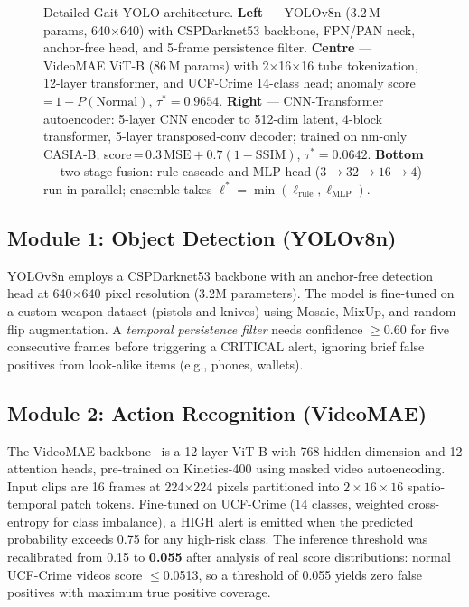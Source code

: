 \documentclass[conference]{IEEEtran}
\begin{document}
\begin{figure}[!t]
{}
\caption{Detailed Gait-YOLO architecture.
\textbf{Left} — YOLOv8n (3.2\,M params, 640$\times$640) with CSPDarknet53
backbone, FPN/PAN neck, anchor-free head, and 5-frame persistence filter.
\textbf{Centre} — VideoMAE ViT-B (86\,M params) with 2$\times$16$\times$16
tube tokenization, 12-layer transformer, and UCF-Crime 14-class head;
anomaly score\,=\,$1-P(\text{Normal})$, $\tau^*=0.9654$.
\textbf{Right} — CNN-Transformer autoencoder: 5-layer CNN encoder to
512-dim latent, 4-block transformer, 5-layer transposed-conv decoder;
trained on nm-only CASIA-B; score\,=\,$0.3\,\text{MSE}+0.7(1-\text{SSIM})$,
$\tau^*=0.0642$.
\textbf{Bottom} — two-stage fusion: rule cascade and MLP head
($3{\to}32{\to}16{\to}4$) run in parallel; ensemble takes
$\ell^*=\min(\ell_\text{rule}, \ell_\text{MLP})$.}
\label{fig:full_arch}
\end{figure}

\subsection{Module 1: Object Detection (YOLOv8n)}

YOLOv8n employs a CSPDarknet53 backbone with an anchor-free detection head
at 640$\times$640 pixel resolution (3.2M parameters).
The model is fine-tuned on a custom weapon dataset (pistols and knives)
using Mosaic, MixUp, and random-flip augmentation.
A \emph{temporal persistence filter} needs confidence $\geq0.60$ for five consecutive frames before triggering a CRITICAL alert, ignoring brief false positives from look-alike items (e.g., phones, wallets).

\subsection{Module 2: Action Recognition (VideoMAE)}

The VideoMAE backbone~\cite{tong2022} is a 12-layer ViT-B with 768 hidden dimension and 12 attention heads, pre-trained on Kinetics-400 using masked video autoencoding.
Input clips are 16 frames at 224$\times$224 pixels partitioned into
$2\!\times\!16\!\times\!16$ spatio-temporal patch tokens.
Fine-tuned on UCF-Crime (14 classes, weighted cross-entropy for class
imbalance), a HIGH alert is emitted when the predicted probability exceeds
0.75 for any high-risk class.
The inference threshold was recalibrated from 0.15 to \textbf{0.055} after
analysis of real score distributions: normal UCF-Crime videos score
$\leq$0.0513, so a threshold of 0.055 yields zero false positives with
maximum true positive coverage.
\end{document}
